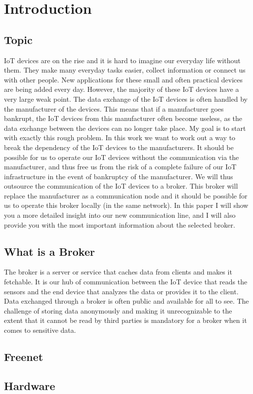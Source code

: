 \section{Introduction}
\subsection{Topic}
IoT devices are on the rise and it is hard to imagine our everyday life without them. They make many everyday tasks easier, collect information or connect us with other people. New applications for these small and often practical devices are being added every day.
\newline
\newline
However, the majority of these IoT devices have a very large weak point. The data exchange of the IoT devices is often handled by the manufacturer of the devices. This means that if a manufacturer goes bankrupt, the IoT devices from this manufacturer often become useless, as the data exchange between the devices can no longer take place.
\newline
\newline
My goal is to start with exactly this rough problem. 
In this work we want to work out a way to break the dependency of the IoT devices to the manufacturers. It should be possible for us to operate our IoT devices without the communication via the manufacturer, and thus free us from the risk of a complete failure of our IoT infrastructure in the event of bankruptcy of the manufacturer. We will thus outsource the communication of the IoT devices to a broker. This broker will replace the manufacturer as a communication node and it should be possible for us to operate this broker locally (in the same network).
\newline
\newline
In this paper I will show you a more detailed insight into our new communication line, and I will also provide you with the most important information about the selected broker. 

\newpage
\subsection{What is a Broker}
The broker is a server or service that caches data from clients and makes it fetchable. It is our hub of communication between the IoT device that reads the sensors and the end device that analyzes the data or provides it to the client.
Data exchanged through a broker is often public and available for all to see. The challenge of storing data anonymously and making it unrecognizable to the extent that it cannot be read by third parties is mandatory for a broker when it comes to sensitive data.

\subsection{Freenet}


\subsection{Hardware}